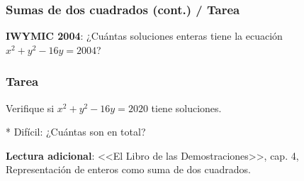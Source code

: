 \documentclass[handout]{beamer}
\begin{document}

\begin{frame}[fragile]
  \frametitle{Sumas de dos cuadrados (cont.) / Tarea}

  \begin{shaded}
    \textbf{IWYMIC 2004}: ¿Cuántas soluciones enteras tiene la ecuación
    $x^2 + y^2 - 16y = 2004$?
  \end{shaded}

  \vspace{\fill}

  \iffalse
  \ifdefined\solutions
  \onslide<2->{\rule{2cm}{1pt}}

  \begin{itemize}
  \item<3-> $x^2 + (y - 8)^2 = 2068 = 4\cdot 11\cdot 47$.

  \item<4-> $11 \equiv 47 \equiv 3 \pmod{4}$.

  \item<5-> Conclusión: no hay soluciones.
  \end{itemize}
  \fi
  \fi
\end{frame}


\begin{frame}
  \frametitle{Tarea}

  \begin{shaded}
    Verifique si $x^2 + y^2 - 16y = 2020$ tiene soluciones.

    * Difícil: ¿Cuántas son en total?
  \end{shaded}

  \vspace{1em}

  \textbf{Lectura adicional}: <<El Libro de las Demostraciones>>, cap. 4,
  Representación de enteros como suma de dos cuadrados.
\end{frame}

\end{document}
